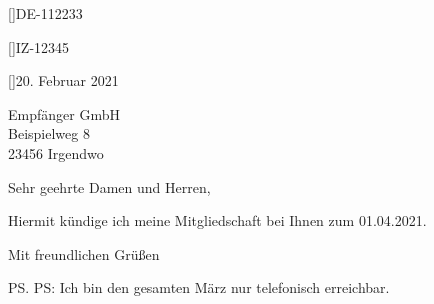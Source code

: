 \documentclass[privatbrief-2]{scrlttr2}
\begin{document}


[\customername]{DE-112233}

[\yourrefname]{IZ-12345}

[\yourmailname]{20. Februar 2021}

\begin{letter}{
  Empfänger GmbH \\
  Beispielweg 8 \\
  23456 Irgendwo
}

\opening{Sehr geehrte Damen und Herren,}

Hiermit kündige ich meine Mitgliedschaft bei Ihnen zum 01.04.2021.


\closing{Mit freundlichen Grüßen}

\ps PS: Ich bin den gesamten März nur telefonisch erreichbar.



\end{letter}
\end{document}
